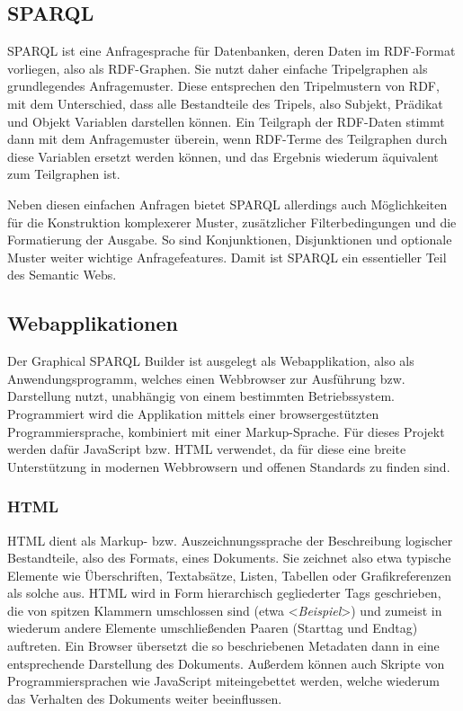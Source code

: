 \subsection{SPARQL}

SPARQL ist eine Anfragesprache für Datenbanken, deren Daten im RDF-Format vorliegen, also als RDF-Graphen. Sie nutzt daher einfache Tripelgraphen als grundlegendes Anfragemuster. Diese entsprechen den Tripelmustern von RDF, mit dem Unterschied, dass alle Bestandteile des Tripels, also Subjekt, Prädikat und Objekt Variablen darstellen können. Ein Teilgraph der RDF-Daten stimmt dann mit dem Anfragemuster überein, wenn RDF-Terme des Teilgraphen durch diese Variablen ersetzt werden können, und das Ergebnis wiederum äquivalent zum Teilgraphen ist.

Neben diesen einfachen Anfragen bietet SPARQL allerdings auch Möglichkeiten für die Konstruktion komplexerer Muster, zusätzlicher Filterbedingungen und die Formatierung der Ausgabe. So sind Konjunktionen, Disjunktionen und optionale Muster weiter wichtige Anfragefeatures. Damit ist SPARQL ein essentieller Teil des Semantic Webs. \cite{sparql-w3c}



\subsection{Webapplikationen}
Der Graphical SPARQL Builder ist ausgelegt als Webapplikation, also als Anwendungsprogramm, welches einen Webbrowser zur Ausführung bzw. Darstellung nutzt, unabhängig von einem bestimmten Betriebssystem. Programmiert wird die Applikation mittels einer browsergestützten Programmiersprache, kombiniert mit einer Markup-Sprache. Für dieses Projekt werden dafür JavaScript bzw. HTML verwendet, da für diese eine breite Unterstützung in modernen Webbrowsern und offenen Standards zu finden sind.

\subsubsection{HTML}
HTML dient als Markup- bzw. Auszeichnungssprache der Beschreibung logischer Bestandteile, also des Formats, eines Dokuments. Sie zeichnet also etwa typische Elemente wie Überschriften, Textabsätze, Listen, Tabellen oder Grafikreferenzen als solche aus. HTML wird in Form hierarchisch gegliederter Tags geschrieben, die von spitzen Klammern umschlossen sind (etwa <\emph{Beispiel}>) und zumeist in wiederum andere Elemente umschließenden Paaren (Starttag und Endtag) auftreten. Ein Browser übersetzt die so beschriebenen Metadaten dann in eine entsprechende Darstellung des Dokuments. Außerdem können auch Skripte von Programmiersprachen wie JavaScript miteingebettet werden, welche wiederum das Verhalten des Dokuments weiter beeinflussen. \cite{html-selfhtml}

